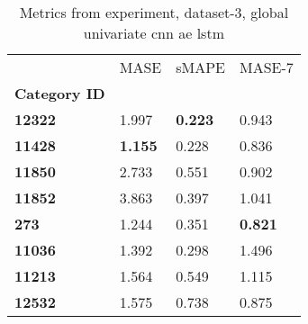 \begin{table}[H]
\centering
\caption{Metrics from experiment, dataset-3, global univariate cnn ae lstm}
\label{table:global-univariate-cnn-ae-lstm-dataset-3}
\begin{tabular}{llll}
\toprule
{} &            MASE &           sMAPE &          MASE-7 \\
\textbf{Category ID} &                 &                 &                 \\
\midrule
\textbf{12322      } &           1.997 &  \textbf{0.223} &           0.943 \\
\textbf{11428      } &  \textbf{1.155} &           0.228 &           0.836 \\
\textbf{11850      } &           2.733 &           0.551 &           0.902 \\
\textbf{11852      } &           3.863 &           0.397 &           1.041 \\
\textbf{273        } &           1.244 &           0.351 &  \textbf{0.821} \\
\textbf{11036      } &           1.392 &           0.298 &           1.496 \\
\textbf{11213      } &           1.564 &           0.549 &           1.115 \\
\textbf{12532      } &           1.575 &           0.738 &           0.875 \\
\bottomrule
\end{tabular}
\end{table}
